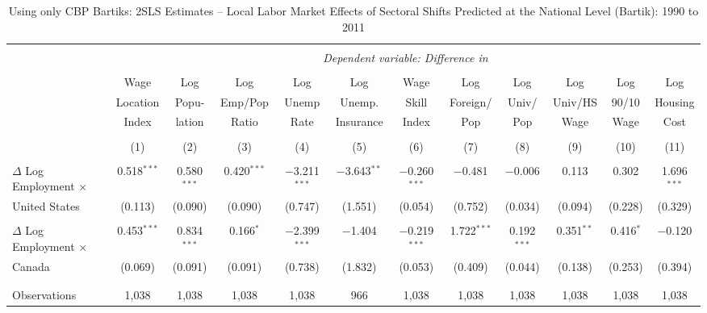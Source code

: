 

\begin{sidewaystable}[!htbp] \centering 
  \caption{Using only CBP Bartiks: 2SLS Estimates -- Local Labor Market Effects of Sectoral Shifts Predicted at the National Level (Bartik):  1990 to 2011} 
  \label{tab:bartik_cbp_2sls} 
\begin{threeparttable}
\begin{tabular}{@{\extracolsep{5pt}}lccccccccccc} 
\\[-1.8ex]\hline 
\hline \\[-1.8ex] 
 & \multicolumn{11}{c}{\textit{Dependent variable: Difference in }} \\ 
\cline{2-12} 
\\[-2.0ex]
 & Wage & Log & Log & Log & Log & Wage & Log & Log & Log & Log & Log \\
 & Location & Popu- & Emp/Pop & Unemp & Unemp. & Skill & Foreign/ & Univ/ & Univ/HS & 90/10 & Housing \\
 & Index & lation & Ratio & Rate & Insurance & Index & Pop & Pop & Wage & Wage & Cost \\
\\[-1.8ex] & (1) & (2) & (3) & (4) & (5) & (6) & (7) & (8) & (9) & (10) & (11)\\ 
\hline \\[-1.8ex] 
 $\Delta$ Log Employment $\times$ & 0.518$^{***}$ & 0.580$^{***}$ & 0.420$^{***}$ & $-$3.211$^{***}$ & $-$3.643$^{**}$ & $-$0.260$^{***}$ & $-$0.481 & $-$0.006 & 0.113 & 0.302 & 1.696$^{***}$ \\ 
United States  & (0.113) & (0.090) & (0.090) & (0.747) & (1.551) & (0.054) & (0.752) & (0.034) & (0.094) & (0.228) & (0.329) \\ 
  & & & & & & & & & & & \\ 
 $\Delta$ Log Employment $\times$ & 0.453$^{***}$ & 0.834$^{***}$ & 0.166$^{*}$ & $-$2.399$^{***}$ & $-$1.404 & $-$0.219$^{***}$ & 1.722$^{***}$ & 0.192$^{***}$ & 0.351$^{**}$ & 0.416$^{*}$ & $-$0.120 \\ 
Canada  & (0.069) & (0.091) & (0.091) & (0.738) & (1.832) & (0.053) & (0.409) & (0.044) & (0.138) & (0.253) & (0.394) \\ 
  & & & & & & & & & & & \\ 
\hline \\[-1.8ex] 
Observations & 1,038 & 1,038 & 1,038 & 1,038 & 966 & 1,038 & 1,038 & 1,038 & 1,038 & 1,038 & 1,038 \\ 

\end{tabular}
\end{threeparttable}
\end{sidewaystable}
